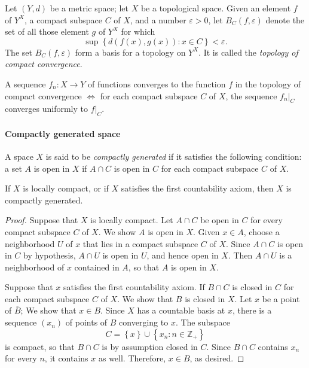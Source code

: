 \begin{definition}
  Let \( (Y, d) \) be a metric space;
  let \( X \) be a topological space.
  Given an element \( f \) of \( Y^X \), a compact subspace \( C \) of \( X \), and a number \( \varepsilon > 0 \), let \( B_C(f, \varepsilon) \) denote the set of all those element \( g \) of \( Y^X \) for which
  \[
    \sup \left\lbrace d(f(x), g(x)): x \in C \right\rbrace < \varepsilon.
  \]
  The set \( B_C(f, \varepsilon) \) form a basis for a topology on \( Y^X \).
  It is called the \emph{topology of compact convergence}.
\end{definition}

\begin{theorem}
  A sequence \( f_n: X \to Y \) of functions converges to the function \( f \) in the topology of compact convergence \( \iff \) for each compact subspace \( C \) of \( X \), the sequence \( \left. f_n \right\vert_C \) converges uniformly to \( \left. f \right\vert_C \).
\end{theorem}

\paragraph{Compactly generated space}

\begin{definition}
  A space \( X \) is said to be \emph{compactly generated} if it satisfies the following condition:
  a set \( A \) is open in \( X \) if \( A \cap  C \) is open in \( C \) for each compact subspace \( C \) of \( X \).
\end{definition}

\begin{lemma}
  If \( X \) is locally compact, or if \( X \) satisfies the first countability axiom, then \( X \) is compactly generated.
\end{lemma}
\begin{proof}
  Suppose that \( X \) is locally compact.
  Let \( A \cap C \) be open in \( C \) for every compact subspace \( C \) of \( X \).
  We show \( A \) is open in \( X \).
  Given \( x \in A \), choose a neighborhood \( U \) of \( x \) that lies in a compact subspace \( C \) of \( X \).
  Since \( A \cap C \) is open in \( C \) by hypothesis, \( A \cap U \) is open in \( U \), and hence open in \( X \).
  Then \( A \cap U \) is a neighborhood of \( x \) contained in \( A \), so that \( A \) is open in \( X \).

  Suppose that \( x \) satisfies the first countability axiom.
  If \( B \cap C \) is closed in \( C \) for each compact subspace \( C \) of \( X \).
  We show that \( B \) is closed in \( X \).
  Let \( x \) be a point of \( \overline{B} \);
  We show that \( x \in B \).
  Since \( X \) has a countable basis at \( x \), there is a sequence \( (x_n) \) of points of \( B \) converging to \( x \).
  The subspace
  \[
    C = \left\lbrace x \right\rbrace \cup \left\lbrace x_n : n \in \mathbb{Z}_+ \right\rbrace
  \]
  is compact, so that \( B \cap C \) is by assumption closed in \( C \).
  Since \( B \cap C \) contains \( x_n \) for every \( n \), it contains \( x \) as well.
  Therefore, \( x \in B \), as desired.
\end{proof}

